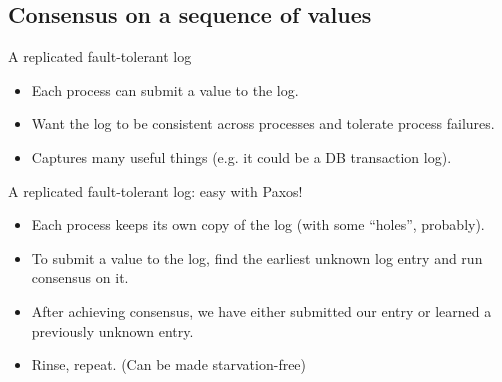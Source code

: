 \documentclass{beamer}
\begin{document}
\subsection{Consensus on a sequence of values}
\begin{frame}{A replicated fault-tolerant log}
  \begin{figure}[!t]
  \centering
  \end{figure}
  \begin{itemize}
    \item Each process can submit a value to the log.
    \item Want the log to be consistent across processes and tolerate process failures.
    \item Captures many useful things (e.g. it could be a DB transaction log).
  \end{itemize}
\end{frame}

\begin{frame}{A replicated fault-tolerant log: easy with Paxos!}
  \begin{itemize}
    \item Each process keeps its own copy of the log (with some ``holes'', probably).
    \item To submit a value to the log, find the earliest unknown log entry and run consensus on it.
    \item After achieving consensus, we have either submitted our entry or learned a previously unknown entry.
    \item Rinse, repeat. (Can be made starvation-free)
  \end{itemize}
\end{frame}
\end{document}
